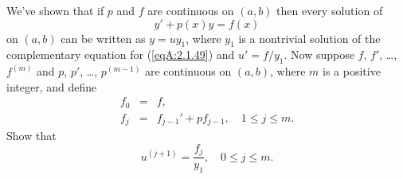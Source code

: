 \documentclass{ximera}
\begin{document}
\begin{problem}\label{exer:2.1.49}
We've shown that if $p$ and $f$ are continuous on $(a,b)$
then every solution of
\begin{equation}\label{eqA:2.1.49}
y'+p(x)y=f(x)
\end{equation}
on $(a,b)$ can be written as $y=uy_1$, where
$y_1$ is a nontrivial solution of the complementary equation for (\ref{eqA:2.1.49})
and $u'=f/y_1$. Now suppose   $f$, $f'$, \dots, $f^{(m)}$ and
$p$, $p'$, \dots, $p^{(m-1)}$ are continuous on $(a,b)$, where $m$
is a positive integer, and define
\begin{eqnarray*}
f_0&=&f,\\ f_j&=&f_{j-1}'+pf_{j-1},\quad 1\leq j\leq m.
\end{eqnarray*}
Show that
$$
u^{(j+1)}=\frac{f_j}{y_1},\quad 0\leq j\leq m.
$$
\end{problem}
\end{document}
